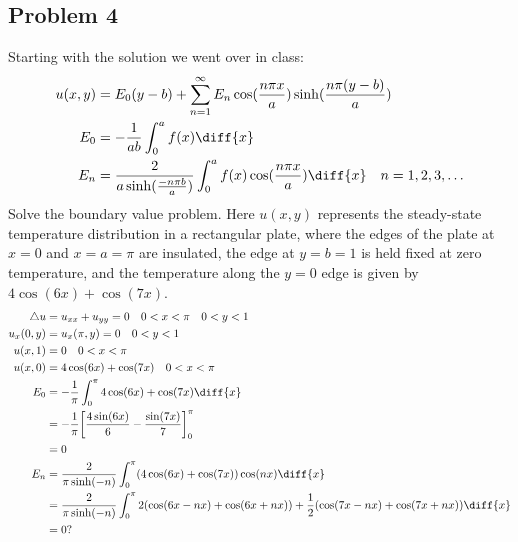 \documentclass{math}
\begin{document}
\subsection*{Problem 4}
Starting with the solution we went over in class:
\begin{align*}
  u(x,y) &= E_0(y-b)+\sum_{n=1}^{\infty}
    E_n\cos(\frac{n\pi x}{a})\sinh(\frac{n\pi(y-b)}{a}) \\
  E_0 &= -\frac{1}{ab}\int_{0}^{a}f(x)\diff{x} \\
  E_n &= \frac{2}{a\sinh(\frac{-n\pi b}{a})}
    \int_{0}^{a}f(x)\cos(\frac{n\pi x}{a})\diff{x} \quad n = 1,2,3,\dots \\
\end{align*}
Solve the boundary value problem. Here \( u(x,y) \) represents the steady-state
temperature distribution in a rectangular plate, where the edges of the plate
at \( x = 0 \) and \( x = a = \pi \) are insulated, the edge at \( y = b = 1 \)
is held fixed at zero temperature, and the temperature along the \( y = 0 \)
edge is given by \( 4\cos(6x)+\cos(7x) \).
\begin{align*}
  \triangle u &= u_{xx}+u_{yy} = 0 \quad 0<x<\pi \quad 0<y<1 \\
  u_x(0,y) &= u_x(\pi,y) = 0 \quad 0<y<1 \\
  u(x,1) &= 0 \quad 0<x<\pi \\
  u(x,0) &= 4\cos(6x)+\cos(7x) \quad 0<x<\pi \\
  E_0 &= -\frac{1}{\pi}\int_{0}^{\pi}4\cos(6x)+\cos(7x)\diff{x} \\
  &= -\frac{1}{\pi}
    \bigg[\frac{4\sin(6x)}{6}-\frac{\sin(7x)}{7}\bigg]_{0}^{\pi} \\
  &= 0 \\
  E_n &= \frac{2}{\pi\sinh(-n)}
    \int_{0}^{\pi}(4\cos(6x)+\cos(7x))\cos(nx)\diff{x} \\
  &= \frac{2}{\pi\sinh(-n)}\int_{0}^{\pi}2(\cos(6x-nx)+\cos(6x+nx))+
    \frac{1}{2}(\cos(7x-nx)+\cos(7x+nx))\diff{x} \\
  &= 0?
\end{align*}
\end{document}
